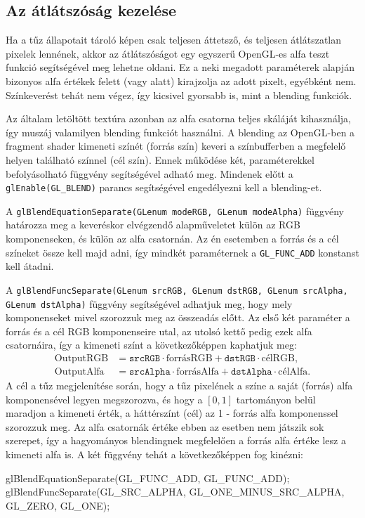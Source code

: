 \subsection{Az átlátszóság kezelése}

Ha a tűz állapotait tároló képen csak teljesen áttetsző, és teljesen átlátszatlan pixelek lennének, akkor az átlátszóságot egy egyszerű OpenGL-es alfa teszt funkció segítségével meg lehetne oldani. Ez a neki megadott paraméterek alapján bizonyos alfa értékek felett (vagy alatt) kirajzolja az adott pixelt, egyébként nem. Színkeverést tehát nem végez, így kicsivel gyorsabb is, mint a blending funkciók.

Az általam letöltött textúra azonban az alfa csatorna teljes skáláját kihasználja, így muszáj valamilyen blending funkciót használni. A blending az OpenGL-ben a fragment shader kimeneti színét (forrás szín) keveri a színbufferben a megfelelő helyen található színnel (cél szín). Ennek működése két, paraméterekkel befolyásolható függvény segítségével adható meg. Mindenek előtt a \texttt{glEnable(GL\_BLEND)} parancs segítségével engedélyezni kell a blending-et.

A \texttt{glBlendEquationSeparate(GLenum modeRGB, GLenum modeAlpha)} függvény határozza meg a keveréskor elvégzendő alapműveletet külön az RGB komponenseken, és külön az alfa csatornán. Az én esetemben a forrás és a cél színeket össze kell majd adni, így mindkét paraméternek a \texttt{GL\_FUNC\_ADD} konstanst kell átadni.

A \texttt{glBlendFuncSeparate(GLenum srcRGB, GLenum dstRGB, GLenum srcAlpha, GLenum dstAlpha)} függvény segítségével adhatjuk meg, hogy mely komponenseket mivel szorozzuk meg az összeadás előtt. Az első két paraméter a forrás és a cél RGB komponenseire utal, az utolsó kettő pedig ezek alfa csatornáira, így a kimeneti színt a következőképpen kaphatjuk meg: 
\begin{align*}
\text{OutputRGB} &= \texttt{srcRGB} \cdot \text{forrásRGB} + \texttt{dstRGB} \cdot \text{célRGB}, \\
\text{OutputAlfa} &= \texttt{srcAlpha} \cdot \text{forrásAlfa} + \texttt{dstAlpha} \cdot \text{célAlfa}.
\end{align*}
A cél a tűz megjelenítése során, hogy a tűz pixelének a színe a saját (forrás) alfa komponensével legyen megszorozva, és hogy a $[0, 1]$ tartományon belül maradjon a kimeneti érték, a háttérszínt (cél) az 1 - forrás alfa komponenssel szorozzuk meg. Az alfa csatornák értéke ebben az esetben nem játszik sok szerepet, így a hagyományos blendingnek megfelelően a forrás alfa értéke lesz a kimeneti alfa is. A két függvény tehát a következőképpen fog kinézni:
\begin{cpp}
glBlendEquationSeparate(GL_FUNC_ADD, GL_FUNC_ADD);
glBlendFuncSeparate(GL_SRC_ALPHA, GL_ONE_MINUS_SRC_ALPHA,
	 GL_ZERO, GL_ONE);
\end{cpp}

